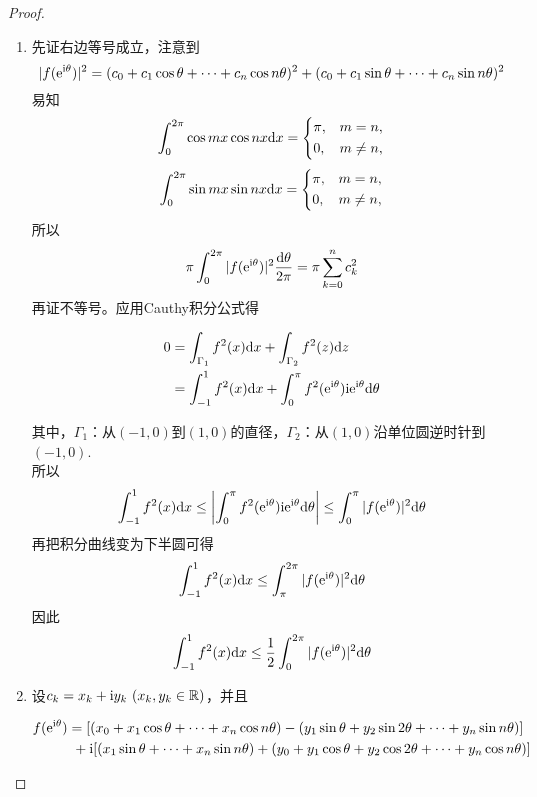 \begin{proof}

    \begin{enumerate}

        \item 
        先证右边等号成立，注意到
        \[|f(\mathrm{e}^{\mathrm{i} \theta})|^2 = (c_0 + c_1 \cos{\theta} + \cdots + c_n \cos{n\theta})^2 + (c_0 + c_1 \sin{\theta} + \cdots + c_n \sin{n\theta})^2\]
        易知
        $$\int_{0}^{2\pi}{\cos{mx}\cos{nx}}\mathrm{d} x = \left\{ 
        \begin{aligned}
            & \pi, & m = n, \\
            & 0, & m \neq n,
        \end{aligned} \right.$$
        $$\int_{0}^{2\pi}{\sin{mx}\sin{nx}}\mathrm{d} x = \left\{ 
        \begin{aligned}
            & \pi, & m = n, \\
            & 0, & m \neq n,
        \end{aligned} \right.$$
        所以
        \[\pi \int_{0}^{2\pi}{|f(\mathrm{e}^{\mathrm{i} \theta})|^2}\dfrac{\mathrm{d} \theta}{2 \pi} = \pi \sum\limits_{k = 0}^{n}{c_k^2}\]
        再证不等号。应用\textup{Cauthy}积分公式得
        
        \begin{align*}
            0 & = \int_{\Gamma_1}{f^2(x)}\mathrm{d} x + \int_{\Gamma_2}{f^2(z)}\mathrm{d} z \\
            & = \int_{-1}^{1}{f^2(x)}\mathrm{d} x + \int_{0}^{\pi}{f^2(\mathrm{e}^{\mathrm{i} \theta})\mathrm{i} \mathrm{e}^{\mathrm{i} \theta}}\mathrm{d} \theta 
        \end{align*}

        其中，$\Gamma_1$：从$(-1, 0)$到$(1, 0)$的直径，$\Gamma_2$：从$(1, 0)$沿单位圆逆时针到$(-1, 0)$. \\
        所以
        \[\int_{-1}^{1}{f^2(x)}\mathrm{d} x \leq \left| \int_{0}^{\pi}{f^2(\mathrm{e}^{\mathrm{i} \theta})\mathrm{i} \mathrm{e}^{\mathrm{i} \theta}}\mathrm{d} \theta \right| \leq \int_{0}^{\pi}{|f(\mathrm{e}^{\mathrm{i} \theta})|^2}\mathrm{d} \theta\]
        再把积分曲线变为下半圆可得
        \[\int_{-1}^{1}{f^2(x)}\mathrm{d} x \leq \int_{\pi}^{2\pi}{|f(\mathrm{e}^{\mathrm{i} \theta})|^2}\mathrm{d} \theta\]
        因此
        \[\int_{-1}^{1}{f^2(x)}\mathrm{d} x \leq \dfrac{1}{2} \int_{0}^{2\pi}{|f(\mathrm{e}^{\mathrm{i} \theta})|^2}\mathrm{d} \theta\]

    \item 
        设$c_k = x_k + \mathrm{i} y_k \ (x_k, y_k \in \mathbb{R})$，并且

    \begin{align*}
        f(\mathrm{e}^{\mathrm{i} \theta}) & = [(x_0 + x_1 \cos{\theta} + \cdots + x_n \cos{n\theta}) - (y_1 \sin{\theta} + y_2 \sin{2\theta} + \cdots + y_n \sin{n\theta})] \\
        & \ + \mathrm{i}[(x_1 \sin{\theta} + \cdots + x_n \sin{n\theta}) + (y_0 + y_1 \cos{\theta} + y_2 \cos{2\theta} + \cdots + y_n \cos{n\theta})]
    \end{align*}


\end{enumerate}
\end{proof}
